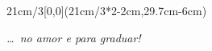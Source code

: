 \begin{textblock*}{21cm/3}[0,0](21cm/3*2-2cm,29.7cm-6cm)
  \begin{flushright}
    {\emph{
      \ldots\ no amor e para graduar!}
    }
  \end{flushright}
\end{textblock*}

\null\newpage


